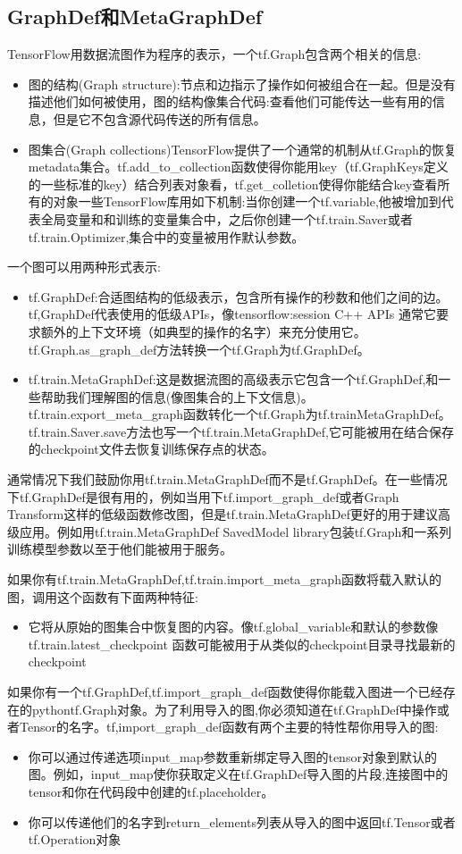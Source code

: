 \subsection{GraphDef和MetaGraphDef}
TensorFlow用数据流图作为程序的表示，一个tf.Graph包含两个相关的信息:
\begin{itemize}
\item 图的结构(Graph structure):节点和边指示了操作如何被组合在一起。但是没有描述他们如何被使用，图的结构像集合代码:查看他们可能传达一些有用的信息，但是它不包含源代码传送的所有信息。
\item 图集合(Graph collections)TensorFlow提供了一个通常的机制从tf.Graph的恢复metadata集合。tf.add\_to\_collection函数使得你能用key（tf.GraphKeys定义的一些标准的key）结合列表对象看，tf.get\_colletion使得你能结合key查看所有的对象一些TensorFlow库用如下机制:当你创建一个tf.variable,他被增加到代表全局变量和和训练的变量集合中，之后你创建一个tf.train.Saver或者tf.train.Optimizer,集合中的变量被用作默认参数。
\end{itemize}
一个图可以用两种形式表示:
\begin{itemize}
	\item tf.GraphDef:合适图结构的低级表示，包含所有操作的秒数和他们之间的边。tf,GraphDef代表使用的低级APIs，像tensorflow:session C++ APIs 通常它要求额外的上下文环境（如典型的操作的名字）来充分使用它。tf.Graph.as\_graph\_def方法转换一个tf.Graph为tf.GraphDef。
	\item tf.train.MetaGraphDef:这是数据流图的高级表示它包含一个tf.GraphDef,和一些帮助我们理解图的信息(像图集合的上下文信息)。tf.train.export\_meta\_graph函数转化一个tf.Graph为tf.trainMetaGraphDef。tf.train.Saver.save方法也写一个tf.train.MetaGraphDef,它可能被用在结合保存的checkpoint文件去恢复训练保存点的状态。
\end{itemize}
通常情况下我们鼓励你用tf.train.MetaGraphDef而不是tf.GraphDef。在一些情况下tf.GraphDef是很有用的，例如当用下tf.import\_graph\_def或者Graph Transform这样的低级函数修改图，但是tf.train.MetaGraphDef更好的用于建议高级应用。例如用tf.train.MetaGraphDef SavedModel library包装tf.Graph和一系列训练模型参数以至于他们能被用于服务。

如果你有tf.train.MetaGraphDef,tf.train.import\_meta\_graph函数将载入默认的图，调用这个函数有下面两种特征:
\begin{itemize}
	\item 它将从原始的图集合中恢复图的内容。像tf.global\_variable和默认的参数像 tf.train.latest\_checkpoint 函数可能被用于从类似的checkpoint目录寻找最新的checkpoint
\end{itemize}
如果你有一个tf.GraphDef,tf.import\_graph\_def函数使得你能载入图进一个已经存在的pythontf.Graph对象。为了利用导入的图,你必须知道在tf.GraphDef中操作或者Tensor的名字。tf,import\_graph\_def函数有两个主要的特性帮你用导入的图:
\begin{itemize}
	\item 你可以通过传递选项input\_map参数重新绑定导入图的tensor对象到默认的图。例如，input\_map使你获取定义在tf.GraphDef导入图的片段,连接图中的tensor和你在代码段中创建的tf.placeholder。
	\item 你可以传递他们的名字到return\_elements列表从导入的图中返回tf.Tensor或者tf.Operation对象
\end{itemize}
